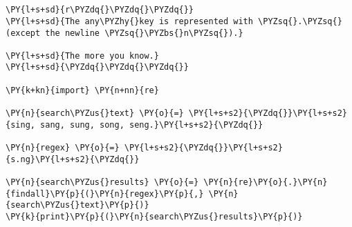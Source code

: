 

\section*{}

\begin{Verbatim}[commandchars=\\\{\}]
\PY{l+s+sd}{r\PYZdq{}\PYZdq{}\PYZdq{}}
\PY{l+s+sd}{The any\PYZhy{}key is represented with \PYZsq{}.\PYZsq{} (except the newline \PYZsq{}\PYZbs{}n\PYZsq{}).}

\PY{l+s+sd}{The more you know.}
\PY{l+s+sd}{\PYZdq{}\PYZdq{}\PYZdq{}}

\PY{k+kn}{import} \PY{n+nn}{re}

\PY{n}{search\PYZus{}text} \PY{o}{=} \PY{l+s+s2}{\PYZdq{}}\PY{l+s+s2}{sing, sang, sung, song, seng.}\PY{l+s+s2}{\PYZdq{}}

\PY{n}{regex} \PY{o}{=} \PY{l+s+s2}{\PYZdq{}}\PY{l+s+s2}{s.ng}\PY{l+s+s2}{\PYZdq{}}

\PY{n}{search\PYZus{}results} \PY{o}{=} \PY{n}{re}\PY{o}{.}\PY{n}{findall}\PY{p}{(}\PY{n}{regex}\PY{p}{,} \PY{n}{search\PYZus{}text}\PY{p}{)}
\PY{k}{print}\PY{p}{(}\PY{n}{search\PYZus{}results}\PY{p}{)}
\end{Verbatim}

